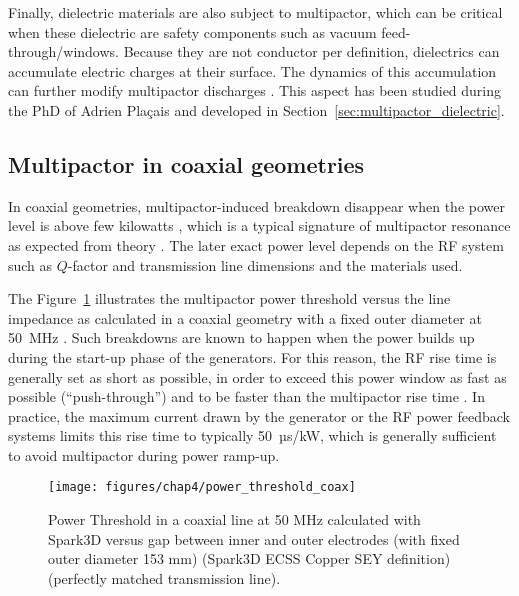 Finally, dielectric materials are also subject to multipactor, which can be critical when these dielectric are safety components such as vacuum feed-through/windows. Because they are not conductor per definition, dielectrics can accumulate electric charges at their surface. The dynamics of this accumulation can further modify multipactor discharges . This aspect has been studied during the PhD of Adrien Plaçais  and developed in Section~\ref{sec:multipactor_dielectric}.


\subsection{Multipactor in coaxial geometries}\label{sec:multipactor_icrf}
In coaxial geometries, multipactor-induced breakdown disappear when the power level is above few kilowatts , which is a typical signature of multipactor resonance as expected from theory  . The later exact power level depends on the RF system such as $Q$-factor and transmission line dimensions and the materials used.  

The Figure~\ref{fig:powerthresholdcoax} illustrates the multipactor power threshold versus the line impedance as calculated in a coaxial geometry with a fixed outer diameter at 50~MHz . Such breakdowns are known to happen when the power builds up during the start-up phase of the generators. For this reason, the RF rise time is generally set as short as possible, in order to exceed this power window as fast as possible (“push-through”) and to be faster than the multipactor rise time . In practice, the maximum current drawn by the generator or the RF power feedback systems limits this rise time to typically 50~µs/kW, which is generally sufficient to avoid multipactor during power ramp-up. 

\begin{figure}[h]
	\centering
	\texttt{[image: figures/chap4/power\_threshold\_coax]}
	\caption{Power Threshold in a coaxial line at 50 MHz calculated with Spark3D versus gap between inner and outer electrodes (with fixed outer diameter 153 mm) (Spark3D ECSS Copper SEY definition) (perfectly matched transmission line).}
	\label{fig:powerthresholdcoax}
\end{figure}




